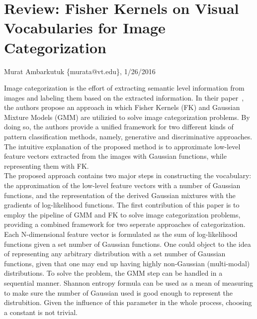 \documentclass[11pt]{article}
\begin{document}
\thispagestyle{empty}
\section{Review: Fisher Kernels on Visual Vocabularies for Image Categorization}
\begin{flushright}
	\small{Murat Ambarkutuk \{murata@vt.edu\}, 1/26/2016}
\end{flushright}
\indent Image categorization is the effort of extracting semantic level information from images and labeling them based on the extracted information.
In their paper~\cite{perronnin2007fisher}, the authors propose an approach in which Fisher Kernels (FK) and Gaussian Mixture Models (GMM) are utilizied to solve image categorization problems.
By doing so, the authors provide a unified framework for two different kinds of pattern classification methods, namely, generative and discriminative approaches.
The intuitive explanation of the proposed method is to approximate low-level feature vectors extracted from the images with Gaussian functions, while representing them with FK.\@ \\
\indent The proposed approach contains two major steps in constructing the vocabulary: the approximation of the low-level feature vectors with a number of Gaussian functions, and the representation of the derived Gaussian mixtures with the gradients of log-likelihood functions.
The first contribution of this paper is to employ the pipeline of GMM and FK to solve image categorization problems, providing a combined framework for two seperate approaches of categorization.
Each N-dimensional feature vector is formulated as the sum of log-likelihood functions given a set number of Gaussian functions.
One could object to the idea of representing any arbitrary distribution with a set number of Gaussian functions, given that one may end up having highly non-Gaussian (multi-modal) distributions.
To solve the problem, the GMM step can be handled in a sequential manner. Shannon entropy formula can be used as a mean of measuring to make sure the number of Gaussian used is good enough to represent the distrubition.
Given the influence of this parameter in the whole process, choosing a constant is not trivial.
\end{document}
